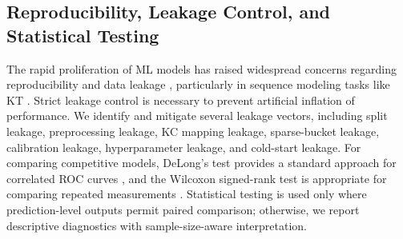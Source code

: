 \subsection{Reproducibility, Leakage Control, and Statistical Testing}
The rapid proliferation of ML models has raised widespread concerns regarding reproducibility and data leakage \cite{kapoor2023leakage}, particularly in sequence modeling tasks like KT \cite{gervet2020deep}. Strict leakage control is necessary to prevent artificial inflation of performance. We identify and mitigate several leakage vectors, including split leakage, preprocessing leakage, KC mapping leakage, sparse-bucket leakage, calibration leakage, hyperparameter leakage, and cold-start leakage. For comparing competitive models, DeLong's test provides a standard approach for correlated ROC curves \cite{delong1988comparing}, and the Wilcoxon signed-rank test is appropriate for comparing repeated measurements \cite{wilcoxon1945individual}. Statistical testing is used only where prediction-level outputs permit paired comparison; otherwise, we report descriptive diagnostics with sample-size-aware interpretation.
